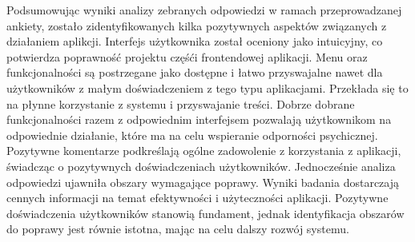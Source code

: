 Podsumowując wyniki analizy zebranych odpowiedzi w ramach przeprowadzanej
ankiety, zostało zidentyfikowanych kilka pozytywnych aspektów związanych z
działaniem aplikcji. Interfejs użytkownika został oceniony jako intuicyjny, co
potwierdza poprawność projektu częśći frontendowej aplikacji. Menu oraz
funkcjonalności są postrzegane jako dostępne i łatwo przyswajalne nawet dla
użytkowników z małym doświadczeniem z tego typu aplikacjami. Przekłada się to na
płynne korzystanie z systemu i przyswajanie treści. Dobrze dobrane
funkcjonalności razem z odpowiednim interfejsem pozwalają użytkownikom na
odpowiednie działanie, które ma na celu wspieranie odporności psychicznej.
Pozytywne komentarze podkreślają ogólne zadowolenie z korzystania z aplikacji,
świadcząc o pozytywnych doświadczeniach użytkowników. Jednocześnie analiza
odpowiedzi ujawniła obszary wymagające poprawy. Wyniki badania dostarczają
cennych informacji na temat efektywności i użyteczności aplikacji. Pozytywne
doświadczenia użytkowników stanowią fundament, jednak identyfikacja obszarów do
poprawy jest równie istotna, mając na celu dalszy rozwój systemu.
